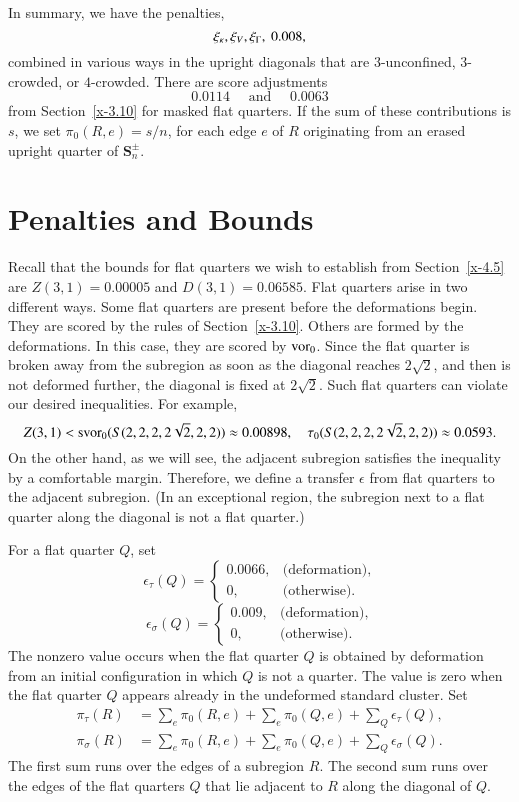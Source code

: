 In summary, we have the penalties,
    $$\xi_\kappa,\xi_V,\xi_\Gamma,\ 0.008,$$
combined in various ways in the upright diagonals that are
$3$-unconfined, $3$-crowded, or $4$-crowded.  There are score
adjustments
    $$0.0114\quad \text{ and }\quad 0.0063$$
from Section~\ref{x-3.10} for masked flat quarters.  If the sum of these
contributions is $s$, we set $\pi_0(R,e)=s/n$, for each edge $e$ of $R$
originating from an erased upright quarter of
    $\mathcal{\mathbf S}_n^\pm$.

\section{Penalties and Bounds} %

Recall that the bounds for flat quarters we wish to establish from
Section~\ref{x-4.5} are $Z(3,1)=0.00005$ and $D(3,1)=0.06585$. Flat
quarters arise in two different ways.  Some flat quarters are present
before the deformations begin.  They are scored by the rules of
Section~\ref{x-3.10}. Others are formed by the deformations.  In this
case, they are scored by $\operatorname{vor}_0$. Since the flat quarter is broken away
from the subregion as soon as the diagonal reaches $2\sqrt{2}$, and then
is not deformed further, the diagonal is fixed at $2\sqrt{2}$.  Such
flat quarters can violate our desired inequalities. For example,
    $$
    Z(3,1)<\operatorname{svor}_0(S(2,2,2,2\sqrt{2},2,2)) \approx 0.00898,\quad
        \tau_0(S(2,2,2,2\sqrt{2},2,2))\approx 0.0593.
    $$
On the other hand, as we will see, the adjacent subregion satisfies the
inequality by a comfortable margin.  Therefore, we define a transfer
$\epsilon$ from flat quarters to the adjacent subregion. (In an
exceptional region, the subregion next to a flat quarter along the
diagonal is not a flat quarter.)

For a flat quarter $Q$, set
    $$
    \epsilon_\tau(Q) =
        \begin{cases} 0.0066,&\text{(deformation),}\\
            0,&\text{(otherwise)}.
        \end{cases}
    $$
    $$
    \epsilon_\sigma(Q) =
        \begin{cases}
         0.009,&\text{(deformation),}\\
            0,&\text{(otherwise)}.
        \end{cases}
    $$
The nonzero value occurs when the flat quarter $Q$ is obtained by
deformation from an initial configuration in which $Q$ is not a quarter.
The value is zero when the flat quarter $Q$ appears already in the
undeformed standard cluster. Set
    $$
    \begin{array}{lll}
    \pi_\tau(R) &= \sum_e \pi_0(R,e) +
    \sum_e\pi_0(Q,e)+\sum_Q \epsilon_\tau(Q),\\
    \pi_\sigma(R)&=\sum_e \pi_0(R,e) +
    \sum_e\pi_0(Q,e)+\sum_Q \epsilon_\sigma(Q).
    \end{array}
    $$
The first sum runs over the edges of a subregion $R$.  The second sum
runs over the edges of the flat quarters $Q$ that lie adjacent to $R$
along the diagonal of $Q$.

